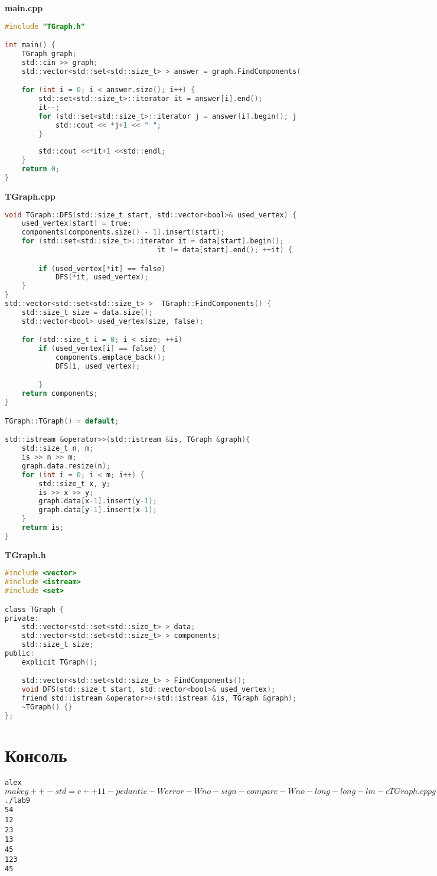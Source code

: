 \textbf{main.cpp}
\begin{lstlisting}[language=C]
#include "TGraph.h"

int main() {
    TGraph graph;
    std::cin >> graph;
    std::vector<std::set<std::size_t> > answer = graph.FindComponents();

    for (int i = 0; i < answer.size(); i++) {
        std::set<std::size_t>::iterator it = answer[i].end();
        it--;
        for (std::set<std::size_t>::iterator j = answer[i].begin(); j != it; j++) {
            std::cout << *j+1 << " ";
        }
        
        std::cout <<*it+1 <<std::endl;
    }
    return 0;
}
\end{lstlisting}

\textbf{TGraph.cpp}
\begin{lstlisting}[language=C]
void TGraph::DFS(std::size_t start, std::vector<bool>& used_vertex) {
    used_vertex[start] = true;
    components[components.size() - 1].insert(start);
    for (std::set<std::size_t>::iterator it = data[start].begin();
                                    it != data[start].end(); ++it) {

        if (used_vertex[*it] == false)
            DFS(*it, used_vertex);
    }
}
std::vector<std::set<std::size_t> >  TGraph::FindComponents() {
    std::size_t size = data.size();
    std::vector<bool> used_vertex(size, false);

    for (std::size_t i = 0; i < size; ++i)
        if (used_vertex[i] == false) {
            components.emplace_back();
            DFS(i, used_vertex);

        }
    return components;
}

TGraph::TGraph() = default;

std::istream &operator>>(std::istream &is, TGraph &graph){
    std::size_t n, m;
    is >> n >> m;
    graph.data.resize(n);
    for (int i = 0; i < m; i++) {
        std::size_t x, y;
        is >> x >> y;
        graph.data[x-1].insert(y-1);
        graph.data[y-1].insert(x-1);
    }
    return is;
}
\end{lstlisting}

\textbf{TGraph.h}
\begin{lstlisting}[language=C]
#include <vector>
#include <istream>
#include <set>

class TGraph {
private:
    std::vector<std::set<std::size_t> > data;
    std::vector<std::set<std::size_t> > components;
    std::size_t size;
public:
    explicit TGraph();

    std::vector<std::set<std::size_t> > FindComponents();
    void DFS(std::size_t start, std::vector<bool>& used_vertex);
    friend std::istream &operator>>(std::istream &is, TGraph &graph);
    ~TGraph() {}
};
\end{lstlisting}
\pagebreak

\section{Консоль}
\begin{alltt}
alex$ make
g++ -std=c++11 -pedantic -Werror -Wno-sign-compare -Wno-long-long -lm -c TGraph.cpp
g++ -std=c++11 -pedantic -Werror -Wno-sign-compare -Wno-long-long -lm -o lab9 main.cpp TGraph.o
alex$ ./lab9 
5 4
1 2
2 3
1 3
4 5
1 2 3
4 5
\end{alltt}
\pagebreak

